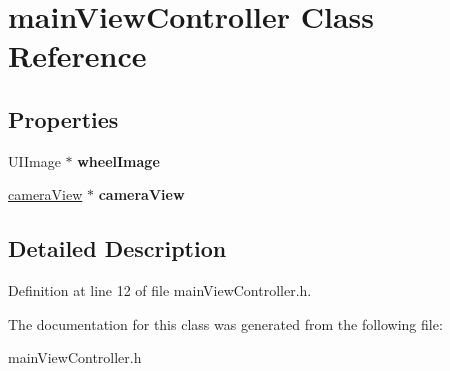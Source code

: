 \hypertarget{interfacemain_view_controller}{
\section{mainViewController Class Reference}
\label{interfacemain_view_controller}
}
\subsection*{Properties}
\begin{DoxyCompactItemize}
\item 
\hypertarget{interfacemain_view_controller_ae33e0c42353d02d0541c6c9de0b27701}{
UIImage $\ast$ {\bfseries wheelImage}}
\label{interfacemain_view_controller_ae33e0c42353d02d0541c6c9de0b27701}

\item 
\hypertarget{interfacemain_view_controller_a034d4e0dca0d818871273e839270c1ac}{
\hyperlink{interfacecamera_view}{cameraView} $\ast$ {\bfseries cameraView}}
\label{interfacemain_view_controller_a034d4e0dca0d818871273e839270c1ac}

\end{DoxyCompactItemize}


\subsection{Detailed Description}


Definition at line 12 of file mainViewController.h.



The documentation for this class was generated from the following file:\begin{DoxyCompactItemize}
\item 
mainViewController.h\end{DoxyCompactItemize}
